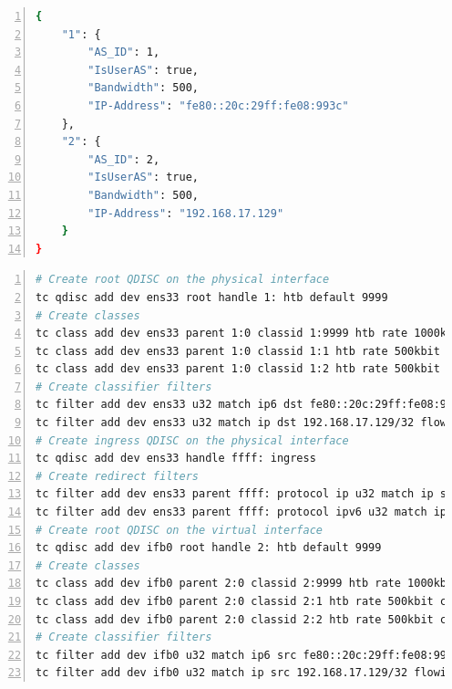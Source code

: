\begin{lstlisting}[language=sh, caption = link\_info.json, captionpos=b, numbers=left, frame=single, breaklines=true, breakatwhitespace=true, showstringspaces=false, label=link_info.json]
{
    "1": {
        "AS_ID": 1,
        "IsUserAS": true,
        "Bandwidth": 500,
        "IP-Address": "fe80::20c:29ff:fe08:993c"
    },
    "2": {
        "AS_ID": 2,
        "IsUserAS": true,
        "Bandwidth": 500,
        "IP-Address": "192.168.17.129"
    }
}
\end{lstlisting}

\newpage

\begin{lstlisting}[language=sh, caption = TC Configuration, captionpos=b, numbers=left, frame=single, breaklines=true, breakatwhitespace=true, showstringspaces=false, label=TC Configuration, basicstyle=\normalsize]
# Create root QDISC on the physical interface
tc qdisc add dev ens33 root handle 1: htb default 9999
# Create classes
tc class add dev ens33 parent 1:0 classid 1:9999 htb rate 1000kbit ceil 1000kbit burst 5k prio 9999 mtu 1500
tc class add dev ens33 parent 1:0 classid 1:1 htb rate 500kbit ceil 500kbit burst 5k prio 1 mtu 1500
tc class add dev ens33 parent 1:0 classid 1:2 htb rate 500kbit ceil 500kbit burst 5k prio 2 mtu 1500
# Create classifier filters 
tc filter add dev ens33 u32 match ip6 dst fe80::20c:29ff:fe08:993c/128 flowid 1:1
tc filter add dev ens33 u32 match ip dst 192.168.17.129/32 flowid 1:2
# Create ingress QDISC on the physical interface
tc qdisc add dev ens33 handle ffff: ingress
# Create redirect filters
tc filter add dev ens33 parent ffff: protocol ip u32 match ip src 0.0.0.0/0 action mirred egress redirect dev ifb0
tc filter add dev ens33 parent ffff: protocol ipv6 u32 match ip6 src ::0/0 action mirred egress redirect dev ifb0
# Create root QDISC on the virtual interface
tc qdisc add dev ifb0 root handle 2: htb default 9999
# Create classes
tc class add dev ifb0 parent 2:0 classid 2:9999 htb rate 1000kbit ceil 1000kbit burst 5k prio 9999 mtu 1500
tc class add dev ifb0 parent 2:0 classid 2:1 htb rate 500kbit ceil 500kbit burst 5k prio 1 mtu 1500
tc class add dev ifb0 parent 2:0 classid 2:2 htb rate 500kbit ceil 500kbit burst 5k prio 2 mtu 1500
# Create classifier filters
tc filter add dev ifb0 u32 match ip6 src fe80::20c:29ff:fe08:993c/128 flowid 2:1
tc filter add dev ifb0 u32 match ip src 192.168.17.129/32 flowid 2:2
\end{lstlisting}